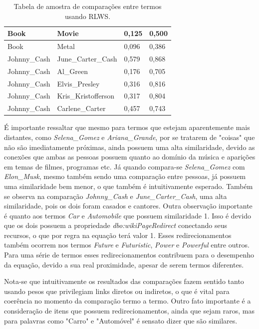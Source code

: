 \begin{table}[H]
\begin{tabular}{|l|l|l|l|}
Book             & Movie               & 0,125                   & 0,500                   \\ \hline
Book             & Metal               & 0,096                   & 0,386                   \\ \hline
Johnny\_Cash     & June\_Carter\_Cash  & 0,579                   & 0,868                   \\ \hline
Johnny\_Cash     & Al\_Green           & 0,176                   & 0,705                   \\ \hline
Johnny\_Cash     & Elvis\_Presley      & 0,316                   & 0,816                   \\ \hline
Johnny\_Cash     & Kris\_Kristofferson & 0,317                   & 0,804                   \\ \hline
Johnny\_Cash     & Carlene\_Carter     & 0,457                   & 0,743                   \\ \hline
\end{tabular}
\caption{Tabela de amostra de comparações entre termos usando \ac{RLWS}.}
\label{tab:rlws_results}
\end{table}

É importante ressaltar que mesmo para termos que estejam aparentemente mais distantes, como \textit{Selena\_Gomez} e \textit{Ariana\_Grande}, por se tratarem de "coisas" que não são imediatamente próximas, ainda possuem uma alta similaridade, devido as conexões que ambas as pessoas possuem quanto ao domínio da música e aparições em temas de filmes, programas etc. Já quando compara-se \textit{Selena\_Gomez} com \textit{Elon\_Musk}, mesmo também sendo uma comparação entre pessoas, já possuem uma similaridade bem menor, o que também é intuitivamente esperado. Também se observa na comparação \textit{Johnny\_Cash} e \textit{June\_Carter\_Cash}, uma alta similaridade, pois os dois foram casados e cantores. Outra observação importante é quanto aos termos \textit{Car} e \textit{Automobile} que possuem similaridade 1. Isso é devido que os dois possuem a propriedade \textit{dbo:wikiPageRedirect} conectando seus recursos, o que por regra na equação terá valor 1. Esses redirecionamentos também ocorrem nos termos \textit{Future} e \textit{Futuristic}, \textit{Power} e \textit{Powerful} entre outros. Para uma série de termos esses redirecionamentos contribuem para o desempenho da equação, devido a sua real proximidade, apesar de serem termos diferentes.

Nota-se que intuitivamente os resultados das comparações fazem sentido tanto usando pesos que privilegiam links diretos ou indiretos, o que é vital para coerência no momento da comparação termo a termo. Outro fato importante é a consideração de itens que possuem redirecionamentos, ainda que sejam raros, mas para palavras como "Carro" e "Automóvel" é sensato dizer que são similares.

